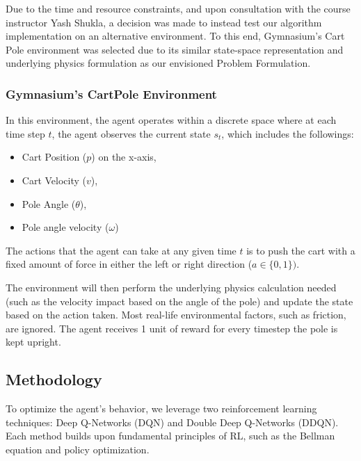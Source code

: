 \documentclass{article}
\begin{document}
Due to the time and resource constraints, and upon consultation with the course instructor Yash Shukla, a decision was made to instead test our algorithm implementation on an alternative environment. To this end, Gymnasium's Cart Pole environment was selected due to its similar state-space representation and underlying physics formulation as our envisioned Problem Formulation.

\subsubsection{Gymnasium's CartPole Environment}

In this environment, the agent operates within a discrete space where at each
time step $t$, the agent observes the current state $s_t$, which includes the
followings:
\begin{itemize}
    \item Cart Position ($p$) on the x-axis,
	\item Cart Velocity ($v$),
	\item Pole Angle ($\theta$),
	\item Pole angle velocity ($\omega$)
\end{itemize}

The actions that the agent can take at any given time $t$ is to push the cart with a fixed amount of force in either the left or right direction ($a \in \{0, 1\})$.

The environment will then perform the underlying physics calculation needed (such as the velocity impact based on the angle of the pole) and update the state based on the action taken. Most real-life environmental factors, such as friction, are ignored. The agent receives 1 unit of reward for every timestep the pole is kept upright.

\subsection{Methodology}
To optimize the agent’s behavior, we leverage two reinforcement learning techniques: Deep Q-Networks (DQN) and Double Deep Q-Networks (DDQN). Each method builds upon fundamental principles of RL, such as the Bellman equation and policy optimization.
\end{document}
